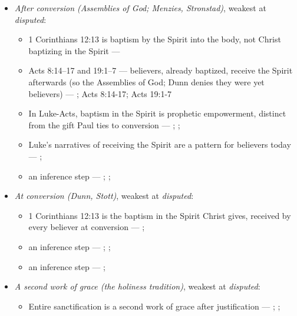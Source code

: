\documentclass[11pt]{article}
\begin{document}
\begin{itemize}
\item \emph{After conversion (Assemblies of God; Menzies, Stronstad)}, weakest at \emph{disputed}:
\begin{itemize}
\item 1 Corinthians 12:13 is baptism by the Spirit into the body, not Christ baptizing in the Spirit --- \cite{assemblies-of-god-baptism-holy-spirit-2010}
\item Acts 8:14–17 and 19:1–7 — believers, already baptized, receive the Spirit afterwards (so the Assemblies of God; Dunn denies they were yet believers) --- \cite{assemblies-of-god-baptism-holy-spirit-2010}; Acts 8:14-17; Acts 19:1-7
\item In Luke-Acts, baptism in the Spirit is prophetic empowerment, distinct from the gift Paul ties to conversion --- \cite{menzies-lukes-understanding-2017}; \cite{menzies-empowered-witness-1994}; \cite{stronstad-charismatic-theology-1984}
\item Luke’s narratives of receiving the Spirit are a pattern for believers today --- \cite{stronstad-charismatic-theology-1984}; \cite{assemblies-of-god-baptism-holy-spirit-2010}
\item an inference step --- \cite{assemblies-of-god-baptism-holy-spirit-2010}; \cite{dunn-baptism-holy-spirit-1970}; \cite{stott-baptism-fullness-1975}
\end{itemize}
\item \emph{At conversion (Dunn, Stott)}, weakest at \emph{disputed}:
\begin{itemize}
\item 1 Corinthians 12:13 is the baptism in the Spirit Christ gives, received by every believer at conversion --- \cite{dunn-baptism-holy-spirit-1970}; \cite{stott-baptism-fullness-1975}
\item an inference step --- \cite{dunn-baptism-holy-spirit-1970}; \cite{stott-baptism-fullness-1975}; \cite{assemblies-of-god-baptism-holy-spirit-2010}
\item an inference step --- \cite{menzies-lukes-understanding-2017}; \cite{menzies-empowered-witness-1994}
\end{itemize}
\item \emph{A second work of grace (the holiness tradition)}, weakest at \emph{disputed}:
\begin{itemize}
\item Entire sanctification is a second work of grace after justification --- \cite[Articles of Faith, X, ¶10]{church-of-the-nazarene-manual-2023}; \cite[to Joseph Benson, 28 December 1770]{wesley-letters-1931}; \cite{bassett-white-paper-article-x-2010}

\end{itemize}
\end{itemize}
\end{document}

